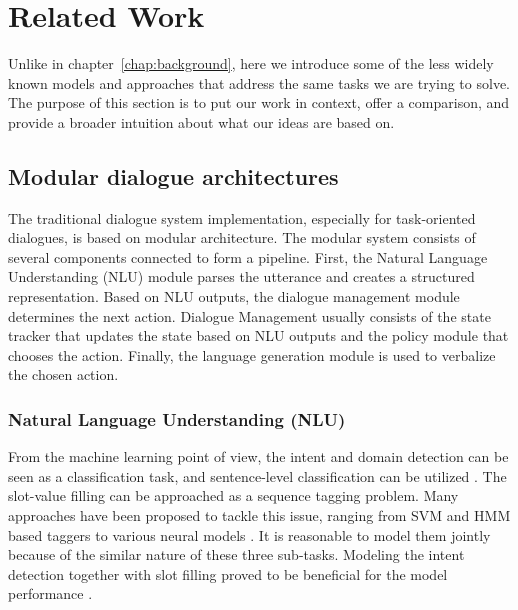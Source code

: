 \chapter{Related Work}%
\label{chap:related}
\label{sec:relwork}
Unlike in chapter~\ref{chap:background}, here we introduce some of the less widely known models and approaches that address the same tasks we are trying to solve.
The purpose of this section is to put our work in context, offer a comparison, and provide a broader intuition about what our ideas are based on.

\section{Modular dialogue architectures}
\label{relwork:modular}
The traditional dialogue system implementation, especially for task-oriented dialogues, is based on modular architecture.
The modular system consists of several components connected to form a pipeline.
First, the Natural Language Understanding (NLU) module parses the utterance and creates a structured representation.
Based on NLU outputs, the dialogue management module determines the next action.
Dialogue Management usually consists of the state tracker that updates the state based on NLU outputs and the policy module that chooses the action.
Finally, the language generation module is used to verbalize the chosen action.
\subsection{Natural Language Understanding (NLU)}
From the machine learning point of view, the intent and domain detection can be seen as a classification task, and sentence-level classification can be utilized \cite{yaman2008integrative,schapire2000boostexter}.
The slot-value filling can be approached as a sequence tagging problem.
Many approaches have been proposed to tackle this issue, ranging from SVM \cite{shi2016recurrent} and HMM \cite{surendran2006dialog} based taggers to various neural models \cite{adel2016comparing, zhang2017position, mesnil2014using}.
It is reasonable to model them jointly because of the similar nature of these three sub-tasks.
Modeling the intent detection together with slot filling proved to be beneficial for the model performance \cite{zhang2017position, liu2016attention, xu2013convolutional}.


